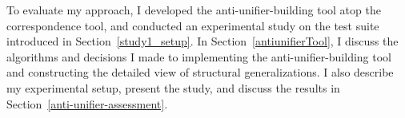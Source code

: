 To evaluate my approach, I developed the anti-unifier-building tool atop the correspondence tool, and conducted an experimental study on the test suite introduced in Section~\ref{study1_setup}. In Section~\ref{antiunifierTool}, I discuss the algorithms and decisions I made to implementing the anti-unifier-building tool and constructing the detailed view of structural generalizations. I also describe my experimental setup, present the study, and discuss the results in Section~\ref{anti-unifier-assessment}.  




